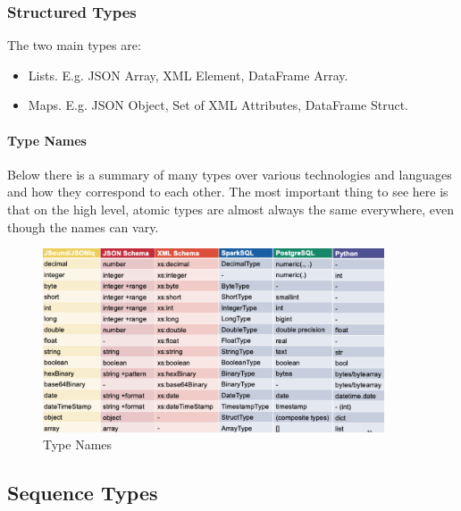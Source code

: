 \subsubsection{Structured Types}
The two main types are:
\begin{itemize}
    \item Lists. E.g. JSON Array, XML Element, DataFrame Array.
    \item Maps. E.g. JSON Object, Set of XML Attributes, DataFrame Struct.
\end{itemize}

\paragraph{Type Names}
Below there is a summary of many types over various technologies and languages and how they correspond to each other. The most important thing to see here is that on the high level, atomic types are almost always the same everywhere, even though the names can vary.

\begin{figure}[h]
    \centering
    \includegraphics[width=0.9\textwidth]{Figures/TypeNames.jpeg}
    \caption{Type Names}\label{fig:TypeNames}
\end{figure}


\subsection{Sequence Types}

